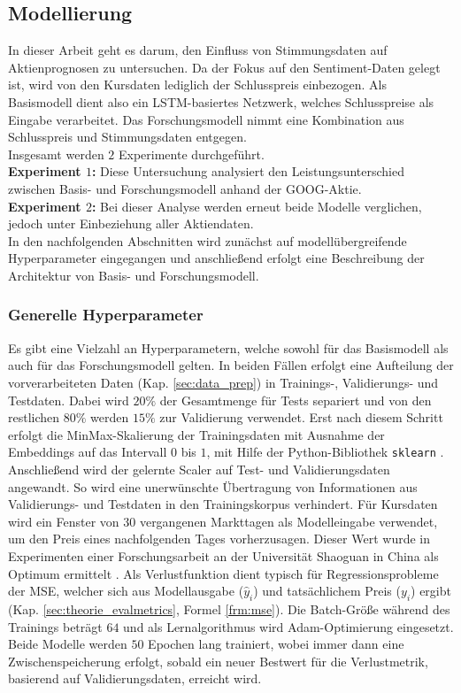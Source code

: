 \newpage
\subsection{Modellierung}\label{sec:modellierung}

In dieser Arbeit geht es darum, den Einfluss von Stimmungsdaten auf Aktienprognosen zu untersuchen. Da der Fokus auf den Sentiment-Daten gelegt ist, wird von den Kursdaten lediglich der Schlusspreis einbezogen. Als Basismodell dient also ein \ac{LSTM}-basiertes Netzwerk, welches Schlusspreise als Eingabe verarbeitet. Das Forschungsmodell nimmt eine Kombination aus Schlusspreis und Stimmungsdaten entgegen. \\
Insgesamt werden $2$ Experimente durchgeführt. \\
\textbf{Experiment $1$:}    
Diese Untersuchung analysiert den Leistungsunterschied zwischen Basis- und Forschungsmodell anhand der GOOG-Aktie. \\
\textbf{Experiment $2$:}   
Bei dieser Analyse werden erneut beide Modelle verglichen, jedoch unter Einbeziehung aller Aktiendaten. \\
In den nachfolgenden Abschnitten wird zunächst auf modellübergreifende Hyperparameter eingegangen und anschließend erfolgt eine Beschreibung der Architektur von Basis- und Forschungsmodell.

\subsubsection{Generelle Hyperparameter}\label{sec:modellierung_generell_hp}

Es gibt eine Vielzahl an Hyperparametern, welche sowohl für das Basismodell als auch für das Forschungsmodell gelten. 
In beiden Fällen erfolgt eine Aufteilung der vorverarbeiteten Daten (Kap. \ref{sec:data_prep}) in Trainings-, Validierungs- und Testdaten. Dabei wird $20\%$ der Gesamtmenge für Tests separiert und von den restlichen $80\%$ werden $15\%$ zur Validierung verwendet.
Erst nach diesem Schritt erfolgt die MinMax-Skalierung der Trainingsdaten mit Ausnahme der Embeddings auf das Intervall $0$ bis $1$, mit Hilfe der Python-Bibliothek \texttt{sklearn} \autocite{website:ScikitLearn}. Anschließend wird der gelernte Scaler auf Test- und Validierungsdaten angewandt. So wird eine unerwünschte Übertragung von Informationen aus Validierungs- und Testdaten in den Trainingskorpus verhindert. 
Für Kursdaten wird ein Fenster von $30$ vergangenen Markttagen als Modelleingabe verwendet, um den Preis eines nachfolgenden Tages vorherzusagen. Dieser Wert wurde in Experimenten einer Forschungsarbeit an der Universität Shaoguan in China als Optimum ermittelt \autocite[Tabelle 3]{xie2024deep}.
Als Verlustfunktion dient typisch für Regressionsprobleme der \ac{MSE}, welcher sich aus Modellausgabe ($\hat{y}_i$) und tatsächlichem Preis ($y_i$) ergibt (Kap. \ref{sec:theorie_evalmetrics}, Formel \ref{frm:mse}). 
Die Batch-Größe während des Trainings beträgt $64$ und als Lernalgorithmus wird Adam-Optimierung eingesetzt. 
Beide Modelle werden $50$ Epochen lang trainiert, wobei immer dann eine Zwischenspeicherung erfolgt, sobald ein neuer Bestwert für die Verlustmetrik, basierend auf Validierungsdaten, erreicht wird.


